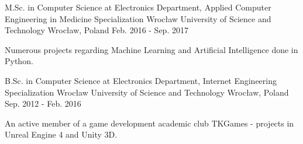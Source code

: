 

\begin{cventries}

  \cventry
    {M.Sc. in Computer Science at Electronics Department, Applied Computer Engineering in Medicine Specialization} %
    {Wrocław University of Science and Technology} %
    {Wrocław, Poland} %
    {Feb. 2016 - Sep. 2017} %
    {
        \begin{cvitems}
            Numerous projects regarding Machine Learning and Artificial Intelligence done in Python.
        \end{cvitems}
    }

  \cventry
    {B.Sc. in Computer Science at Electronics Department, Internet Engineering Specialization} %
    {Wrocław University of Science and Technology} %
    {Wrocław, Poland} %
    {Sep. 2012 - Feb. 2016} %
    {
        \begin{cvitems}
            An active member of a game development academic club TKGames - projects in Unreal Engine 4 and Unity 3D.
        \end{cvitems}
    }

\end{cventries}
